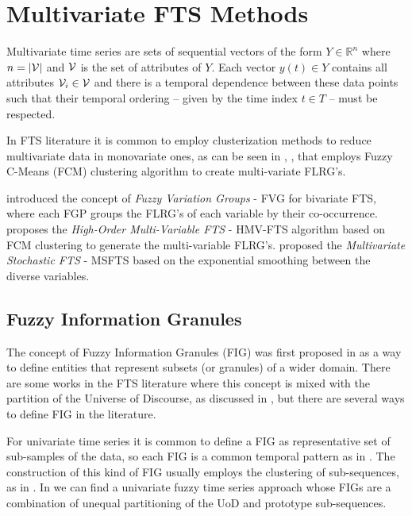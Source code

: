 \section{Multivariate FTS Methods}
\label{sec:fts_multivariate}

Multivariate time series are sets of sequential vectors of the form $Y \in \mathbb{R}^n$ where $n = |\mathcal{V}|$ and $\mathcal{V}$ is the set of attributes of $Y$. Each vector $y(t) \in Y$ contains all attributes $\mathcal{V}_i \in \mathcal{V}$ and there is a temporal dependence between these data points such that their temporal ordering -- given by the time index $t \in T$ -- must be respected. 

In FTS literature it is common to employ clusterization methods to reduce multivariate data in monovariate ones, as can be seen in \cite{Li2008b}, \cite{Chen2010}, \cite{sun2014} that employs Fuzzy C-Means (FCM) clustering algorithm to create multi-variate FLRG's.

\cite{Chen2011} introduced the concept of \textit{Fuzzy Variation Groups} - FVG for bivariate FTS, where each FGP groups the FLRG's of each variable by their co-occurrence. \cite{Askari2015} proposes the \textit{High-Order Multi-Variable FTS} - HMV-FTS algorithm based on FCM clustering to generate the multi-variable FLRG's. \cite{Jilani2008} proposed the \textit{Multivariate Stochastic FTS} - MSFTS based on the exponential smoothing between the diverse variables.

\subsection{Fuzzy Information Granules}

The concept of Fuzzy Information Granules (FIG) was first proposed in \cite{Zadeh1996} as a way to define entities that represent subsets (or granules) of a wider domain. There are some works in the FTS literature where this concept is mixed with the partition of the Universe of Discourse, as discussed in \cite{Lu2014, Chen2015}, but there are several ways to define FIG in the literature. 

For univariate time series it is common to define a FIG as representative set of sub-samples of the data, so each FIG is a common temporal pattern as in \cite{Yang2017b}. The construction of this kind of FIG usually employs the clustering of sub-sequences, as in \cite{Magalhaes2008}. In \cite{Wang2014a, Wang2015} we can find a univariate fuzzy time series approach whose FIGs are a combination of unequal partitioning of the UoD and prototype sub-sequences. 

